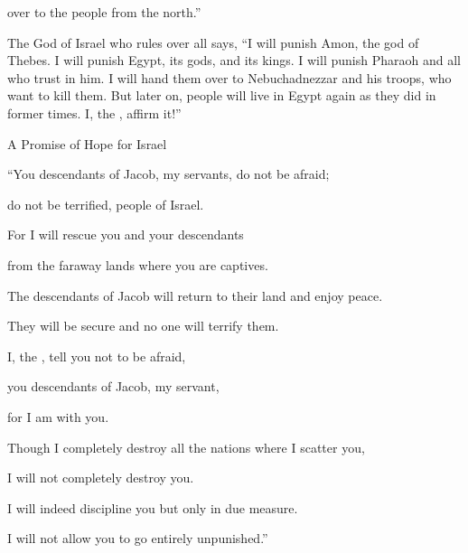 {over to the people
from the north.”
\par }{\PP {}The
{}
God
of Israel
who rules over all
says,
“I
will punish
Amon,
the god of Thebes.
I will punish Egypt,
its gods,
and its kings.
I will punish Pharaoh
and all who trust in him.
I will hand
them over
to Nebuchadnezzar
and his troops,
who want
to kill
them. But later
on, people will live
in Egypt again as they did in former
times.
I, the
{}, affirm it!”
\par }{\SH A Promise of Hope for Israel
\par }{\Q {}“You
descendants of Jacob,
my servants,
do not
be afraid;
\par }{\Q do not
be terrified,
people of Israel.
\par }{\Q For
I
will rescue
you and your descendants
\par }{\Q from
the faraway lands where
you are captives.
\par }{\Q The descendants
of Jacob
will return
to their land
and enjoy peace.
\par }{\Q They will be secure
and no
one will terrify them.
\par }{\Q {}I, the
{}, tell you
not
to be afraid,
\par }{\Q you descendants of Jacob,
my servant,
\par }{\Q for
I am
with
you.
\par }{\Q Though
I completely
destroy all
the nations
where
I scatter
you,
\par }{\Q I will not
completely
destroy you.
\par }{\Q I will indeed discipline
you but only in due
measure.
\par }{\Q I will not
allow you to go entirely unpunished.”


\par }

